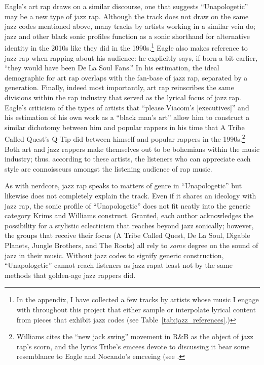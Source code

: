 Eagle's art rap draws on a similar discourse, one that suggests ``Unapologetic'' may be a new type
of jazz rap. Although the track does not draw on the same jazz codes mentioned above, many tracks 
by artists working in a similar vein do; jazz and other black sonic profiles function as a sonic 
shorthand for alternative identity in the 2010s like they did in the 1990s.\footnote{
    In the appendix, I have collected a few tracks by artists whose music I engage with throughout 
    this project that either sample or interpolate lyrical content from pieces that exhibit jazz codes 
    (see Table~\ref{tab:jazz_references}.)}
Eagle also makes reference to jazz rap when rapping about his audience: he explicitly says, if born
a  bit earlier, ``they would have been De La Soul Fans.'' In his estimation, the ideal demographic
for art  rap overlaps with the fan-base of jazz rap, separated by a generation. Finally, indeed most
importantly, art rap reinscribes the same divisions within the rap industry that served as the lyrical
focus of jazz rap. Eagle's criticism of the types of artists that ``please Viacom's [executives]'' and
his  estimation of his own work as a ``black man's art'' allow him to construct a similar dichotomy between
him and popular rappers in his time that A Tribe Called Quest's Q-Tip did between himself and popular
rappers in the 1990s.\footnote{
    Williams cites the ``new jack swing'' movement in R\&B as the object of jazz rap's scorn, and the
    lyrics Tribe's emcees devote to discussing it bear some resemblance to Eagle and Nocando's emceeing
    (see \autocite[56]{justinawilliamsRhyminStealinMusical2013}.}
Both art and jazz rappers make themselves out to be bohemians within the music industry; thus. according
to these artists, the listeners who can appreciate each style are connoisseurs amongst the listening 
audience of rap music.

As with nerdcore, jazz rap speaks to matters of genre in ``Unapologetic'' but likewise does not completely
explain the track. Even if it shares an ideology with jazz rap, the sonic profile of ``Unapologetic'' does
not fit neatly into the generic category Krims and Williams construct. Granted, each author acknowledges the
possibility for a stylistic eclecticism that reaches beyond jazz sonically; however, the groups that receive
their focus (A Tribe Called Quest, De La Soul, Digable Planets, Jungle Brothers, and The Roots) all rely to
\emph{some} degree on the sound of jazz in their music. Without jazz codes to signify generic construction,
``Unapologetic'' cannot reach listeners as jazz rap\textemdash at least not by the same methods that 
golden-age jazz rappers did.

